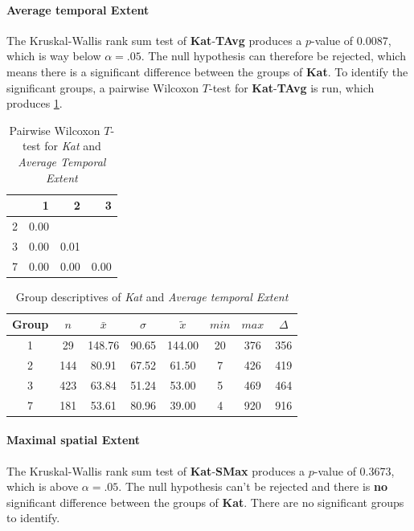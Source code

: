 \paragraph{Average temporal Extent}
The Kruskal-Wallis rank sum test of \textbf{Kat}-\textbf{TAvg} produces a $p$-value of 0.0087, which is way below $\alpha=.05$. The null hypothesis can therefore be rejected, which means there is a significant difference between the groups of \textbf{Kat}. To identify the significant groups, a pairwise Wilcoxon $T$-test for \textbf{Kat}-\textbf{TAvg} is run, which produces \cref{tbl:wilcoxon_baysis_initiator_Kat_TAvg}. 
\begin{table}[ht]
	\small
	\centering
    \begin{tabular}{rrrr}
        \toprule
        & 1 & 2 & 3 \\ 
        \midrule
        2 & 0.00 &  &  \\ 
        3 & 0.00 & 0.01 &  \\ 
        7 & 0.00 & 0.00 & 0.00 \\ 
        \bottomrule
    \end{tabular}
	\caption{Pairwise Wilcoxon $T$-test for \textit{Kat} and \textit{Average Temporal Extent}}
	\label{tbl:wilcoxon_baysis_initiator_Kat_TAvg}
\end{table}
\begin{table}[ht]
	\small
	\centering
    \begin{tabular}{c|c|c|c|c|c|c|c}
        \toprule
        Group & $n$ & $\bar{x}$ & $\sigma$ & $\tilde{x}$ & $min$ & $max$ & $\Delta$ \\
        \midrule
        1 & 29  & 148.76 & 90.65 & 144.00 & 20 & 376 & 356 \\ 
        2 & 144 & 80.91  & 67.52 & 61.50  & 7  & 426 & 419 \\ 
        3 & 423 & 63.84  & 51.24 & 53.00  & 5  & 469 & 464 \\ 
        7 & 181 & 53.61  & 80.96 & 39.00  & 4  & 920 & 916 \\ 
        \bottomrule
    \end{tabular}
	\caption{Group descriptives of \textit{Kat} and \textit{Average temporal Extent}}
	\label{tbl:descriptives_baysis_initiator_Kat_TAvg}
\end{table}

\paragraph{Maximal spatial Extent}
The Kruskal-Wallis rank sum test of \textbf{Kat}-\textbf{SMax} produces a $p$-value of 0.3673, which is above $\alpha=.05$. The null hypothesis can't be rejected and there is \textbf{no} significant difference between the groups of \textbf{Kat}. There are no significant groups to identify.

